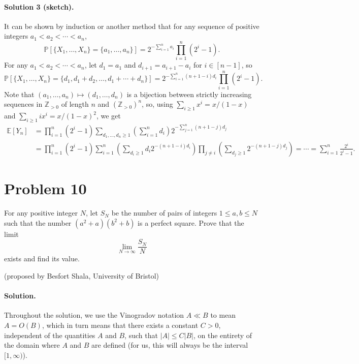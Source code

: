 \documentclass{article}
\begin{document}
\paragraph{Solution 3 (sketch).}
It can be shown by induction or another method that for any sequence of positive integers $a_1 < a_2 < \cdots < a_n$,
\[
\mathbb{P}[\{X_1, \ldots, X_n\} = \{a_1, \ldots, a_n\}] = 2^{-\sum_{i=1}^n a_i} \prod_{i=1}^n (2^i - 1).
\]
For any $a_1 < a_2 < \cdots < a_n$, let $d_1 = a_1$ and $d_{i+1} = a_{i+1} - a_i$ for $i \in [n-1]$, so
\[
\mathbb{P}[\{X_1, \ldots, X_n\} = \{d_1, d_1 + d_2, \ldots, d_1 + \cdots + d_n\}] = 2^{-\sum_{i=1}^n (n+1-i) d_i} \prod_{i=1}^n (2^i - 1).
\]
Note that $(a_1, \ldots, a_n) \mapsto (d_1, \ldots, d_n)$ is a bijection between strictly increasing sequences in $\mathbb{Z}_{>0}$ of length $n$ and $(\mathbb{Z}_{>0})^n$, so, using $\sum_{i \geq 1} x^i = x/(1-x)$ and $\sum_{i \geq 1} i x^i = x/(1-x)^2$, we get
\begin{align*}
\mathbb{E}[Y_n] &= \prod_{i=1}^n (2^i - 1) \sum_{d_1, \ldots, d_n \geq 1} \left(\sum_{i=1}^n d_i\right) 2^{-\sum_{j=1}^n (n+1-j) d_j} \\
&= \prod_{i=1}^n (2^i - 1) \sum_{i=1}^n \left(\sum_{d_i \geq 1} d_i 2^{-(n+1-i) d_i}\right) \prod_{j \neq i} \left(\sum_{d_j \geq 1} 2^{-(n+1-j) d_j}\right) = \cdots = \sum_{i=1}^n \frac{2^i}{2^i - 1}.
\end{align*}

\section*{Problem 10}
For any positive integer $N$, let $S_N$ be the number of pairs of integers $1 \leq a, b \leq N$ such that the number $(a^2 + a)(b^2 + b)$ is a perfect square. Prove that the limit
\[
\lim_{N \to \infty} \frac{S_N}{N}
\]
exists and find its value.

(proposed by Besfort Shala, University of Bristol)

\paragraph{Solution.}
Throughout the solution, we use the Vinogradov notation $A \ll B$ to mean $A = O(B)$, which in turn means that there exists a constant $C > 0$, independent of the quantities $A$ and $B$, such that $|A| \leq C|B|$, on the entirety of the domain where $A$ and $B$ are defined (for us, this will always be the interval $[1, \infty)$).
\end{document}
